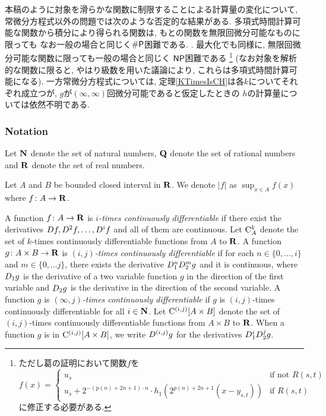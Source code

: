 本稿のように対象を滑らかな関数に制限することによる計算量の変化について,
常微分方程式以外の問題では次のような否定的な結果がある.
多項式時間計算可能な関数から積分により得られる関数は, 
もとの関数を無限回微分可能なものに限っても
なお一般の場合と同じく$\mathsf{\#P}$困難である. 
\cite[定理5.33]{ko1991complexity}.
最大化でも同様に, 
無限回微分可能な関数に限っても一般の場合と同じく
$\mathsf{NP}$困難である\cite[定理3.7]{ko1991complexity}%
\footnote{%
ただし葛\cite[定理3.7]{ko1991complexity}の証明において関数$f$を
\[f(x) = 
\begin{cases}
 u_s & \text{if not } R(s,t) \\
 u_s + 2^{-(p(n)+2n+1)\cdot n} \cdot h_1(2^{p(n)+2n+1} (x - y_{s,t})) & \text{if } R(s,t)
\end{cases}\]
に修正する必要がある.
}
(なお対象を解析的な関数に限ると, 
やはり級数を用いた議論により, 
これらは多項式時間計算可能になる). 
一方常微分方程式については, 
定理\ref{KTimesIsCH}は各$k$についてそれぞれ成立つが, 
$g$が$(\infty, \infty)$回微分可能であると仮定したときの
$h$の計算量については依然不明である. 

\subsubsection*{Notation}
Let $\mathbf N$ denote the set of natural numbers,
$\mathbf Q$ denote the set of rational numbers 
and $\mathbf R$ denote the set of real numbers.

Let $A$ and $B$ be bounded closed interval in $\mathbf R$.
We denote $|f|$ as $\sup_{x \in A} f(x)$ where $f \colon A \to \mathbf R$.


A function $f \colon A \to \mathbf R$ is \emph{$i$-times continuously differentiable}
if there exist the derivatives $D f, D^2 f, \dots, D^i f$ and all of them are continuous.
Let $\mathrm C^k_A$ denote the set of $k$-times continuously differentiable functions from $A$ to $\mathbf R$.
A function $g \colon A \times B \to \mathbf R$ is \emph{$(i, j)$-times continuously  differentiable}
if for each $n \in \{0, \dots, i\}$ and $m \in \{0, \dots j\}$,
there exists the derivative $D_1^n D_2^m g$ and it is continuous,
where $D_1 g$ is the derivative  of a two variable function $g$ in the direction of the first variable
and $D_2 g$ is the derivative in the direction of the second variable.
A function $g$ is \emph{$(\infty, j)$-times continuously differentiable}
if $g$ is $(i, j)$-times continuously differentiable for all $i \in \mathbf N$.
Let $\mathrm C^{(i,j)}{[A \times B]}$ denote the set of 
$(i, j)$-times continuously  differentiable functions from $A \times B$ to $\mathbf R$.
When a function $g$ is in $\mathrm C^{(i,j)}[A \times B]$,
we write $D^{(i,j)}g$ for the derivatives $D_1^i D_2^j g$.
